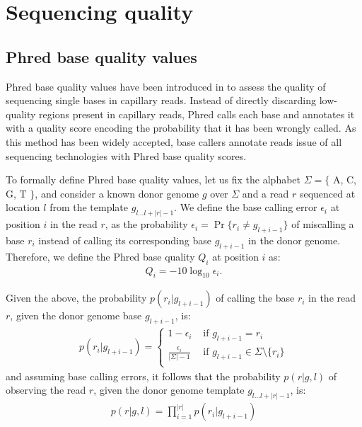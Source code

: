 \section{Sequencing quality}

\subsection{Phred base quality values}

Phred base quality values have been introduced in \citep{Ewing1998, Ewing1998b} to assess the quality of sequencing single bases in capillary reads.
Instead of directly discarding low-quality regions present in capillary reads, Phred calls each base and annotates it with a quality score encoding the probability that it has been wrongly called.
As this method has been widely accepted, base callers annotate reads issue of all sequencing technologies with Phred base quality scores.

To formally define Phred base quality values, let us fix the alphabet $\Sigma = \{$ A, C, G, T $\}$, and consider a known donor genome $g$ over $\Sigma$ and a read $r$ sequenced at location $l$ from the template $g_{l \dots l+|r|-1}$.
We define the base calling error $\epsilon_i$ at position $i$ in the read $r$, as the probability $\epsilon_i = \Pr \{ r_i \neq g_{l+i-1}\}$ of miscalling a base $r_i$ instead of calling its corresponding base $g_{l+i-1}$ in the donor genome.
Therefore, we define the Phred base quality $Q_i$ at position $i$ as:
\begin{eqnarray}
Q_i = -10 \log_{10} \epsilon_i.
\end{eqnarray}

Given the above, the probability $p(r_i | g_{l+i-1})$ of calling the base $r_i$ in the read $r$, given the donor genome base $g_{l+i-1}$, is:
\begin{eqnarray}
p(r_i | g_{l+i-1}) = \left\{
\begin{array}{ll}
1-\epsilon_i                  & \text{ if } g_{l+i-1} = r_i\\
\frac{\epsilon_i}{|\Sigma|-1} & \text{ if } g_{l+i-1} \in \Sigma \setminus \{r_i\}\\
\end{array}
\right.
\end{eqnarray}
and assuming \iid base calling errors, it follows that the probability $p(r | g, l)$ of observing the read $r$, given the donor genome template $g_{l \dots l+|r|-1}$, is:
\begin{eqnarray}
\label{eq:phred}
p(r | g, l) = \prod_{i=1}^{|r|}{p(r_i | g_{l+i-1})}
\end{eqnarray}



